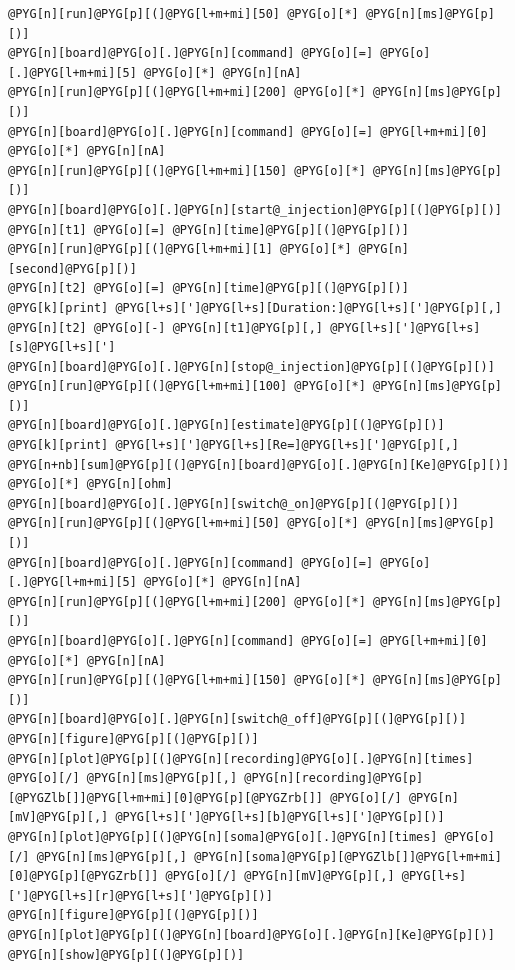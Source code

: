 \documentclass[letterpaper,10pt,english]{manual}
\begin{document}
\begin{Verbatim}[commandchars=@\[\]]
@PYG[n][run]@PYG[p][(]@PYG[l+m+mi][50] @PYG[o][*] @PYG[n][ms]@PYG[p][)]
@PYG[n][board]@PYG[o][.]@PYG[n][command] @PYG[o][=] @PYG[o][.]@PYG[l+m+mi][5] @PYG[o][*] @PYG[n][nA]
@PYG[n][run]@PYG[p][(]@PYG[l+m+mi][200] @PYG[o][*] @PYG[n][ms]@PYG[p][)]
@PYG[n][board]@PYG[o][.]@PYG[n][command] @PYG[o][=] @PYG[l+m+mi][0] @PYG[o][*] @PYG[n][nA]
@PYG[n][run]@PYG[p][(]@PYG[l+m+mi][150] @PYG[o][*] @PYG[n][ms]@PYG[p][)]
@PYG[n][board]@PYG[o][.]@PYG[n][start@_injection]@PYG[p][(]@PYG[p][)]
@PYG[n][t1] @PYG[o][=] @PYG[n][time]@PYG[p][(]@PYG[p][)]
@PYG[n][run]@PYG[p][(]@PYG[l+m+mi][1] @PYG[o][*] @PYG[n][second]@PYG[p][)]
@PYG[n][t2] @PYG[o][=] @PYG[n][time]@PYG[p][(]@PYG[p][)]
@PYG[k][print] @PYG[l+s][']@PYG[l+s][Duration:]@PYG[l+s][']@PYG[p][,] @PYG[n][t2] @PYG[o][-] @PYG[n][t1]@PYG[p][,] @PYG[l+s][']@PYG[l+s][s]@PYG[l+s][']
@PYG[n][board]@PYG[o][.]@PYG[n][stop@_injection]@PYG[p][(]@PYG[p][)]
@PYG[n][run]@PYG[p][(]@PYG[l+m+mi][100] @PYG[o][*] @PYG[n][ms]@PYG[p][)]
@PYG[n][board]@PYG[o][.]@PYG[n][estimate]@PYG[p][(]@PYG[p][)]
@PYG[k][print] @PYG[l+s][']@PYG[l+s][Re=]@PYG[l+s][']@PYG[p][,] @PYG[n+nb][sum]@PYG[p][(]@PYG[n][board]@PYG[o][.]@PYG[n][Ke]@PYG[p][)] @PYG[o][*] @PYG[n][ohm]
@PYG[n][board]@PYG[o][.]@PYG[n][switch@_on]@PYG[p][(]@PYG[p][)]
@PYG[n][run]@PYG[p][(]@PYG[l+m+mi][50] @PYG[o][*] @PYG[n][ms]@PYG[p][)]
@PYG[n][board]@PYG[o][.]@PYG[n][command] @PYG[o][=] @PYG[o][.]@PYG[l+m+mi][5] @PYG[o][*] @PYG[n][nA]
@PYG[n][run]@PYG[p][(]@PYG[l+m+mi][200] @PYG[o][*] @PYG[n][ms]@PYG[p][)]
@PYG[n][board]@PYG[o][.]@PYG[n][command] @PYG[o][=] @PYG[l+m+mi][0] @PYG[o][*] @PYG[n][nA]
@PYG[n][run]@PYG[p][(]@PYG[l+m+mi][150] @PYG[o][*] @PYG[n][ms]@PYG[p][)]
@PYG[n][board]@PYG[o][.]@PYG[n][switch@_off]@PYG[p][(]@PYG[p][)]
@PYG[n][figure]@PYG[p][(]@PYG[p][)]
@PYG[n][plot]@PYG[p][(]@PYG[n][recording]@PYG[o][.]@PYG[n][times] @PYG[o][/] @PYG[n][ms]@PYG[p][,] @PYG[n][recording]@PYG[p][@PYGZlb[]]@PYG[l+m+mi][0]@PYG[p][@PYGZrb[]] @PYG[o][/] @PYG[n][mV]@PYG[p][,] @PYG[l+s][']@PYG[l+s][b]@PYG[l+s][']@PYG[p][)]
@PYG[n][plot]@PYG[p][(]@PYG[n][soma]@PYG[o][.]@PYG[n][times] @PYG[o][/] @PYG[n][ms]@PYG[p][,] @PYG[n][soma]@PYG[p][@PYGZlb[]]@PYG[l+m+mi][0]@PYG[p][@PYGZrb[]] @PYG[o][/] @PYG[n][mV]@PYG[p][,] @PYG[l+s][']@PYG[l+s][r]@PYG[l+s][']@PYG[p][)]
@PYG[n][figure]@PYG[p][(]@PYG[p][)]
@PYG[n][plot]@PYG[p][(]@PYG[n][board]@PYG[o][.]@PYG[n][Ke]@PYG[p][)]
@PYG[n][show]@PYG[p][(]@PYG[p][)]
\end{Verbatim}

\resetcurrentobjects
\hypertarget{--doc-examples-electrophysiology_bridge}{}
\end{document}
